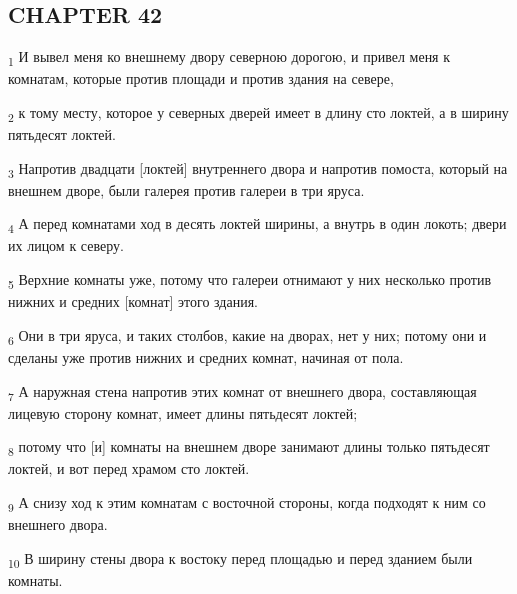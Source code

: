 \subsection{CHAPTER 42}
\begin{tcolorbox}
\textsubscript{1} И вывел меня ко внешнему двору северною дорогою, и привел меня к комнатам, которые против площади и против здания на севере,
\end{tcolorbox}
\begin{tcolorbox}
\textsubscript{2} к тому месту, которое у северных дверей имеет в длину сто локтей, а в ширину пятьдесят локтей.
\end{tcolorbox}
\begin{tcolorbox}
\textsubscript{3} Напротив двадцати [локтей] внутреннего двора и напротив помоста, который на внешнем дворе, были галерея против галереи в три яруса.
\end{tcolorbox}
\begin{tcolorbox}
\textsubscript{4} А перед комнатами ход в десять локтей ширины, а внутрь в один локоть; двери их лицом к северу.
\end{tcolorbox}
\begin{tcolorbox}
\textsubscript{5} Верхние комнаты уже, потому что галереи отнимают у них несколько против нижних и средних [комнат] этого здания.
\end{tcolorbox}
\begin{tcolorbox}
\textsubscript{6} Они в три яруса, и таких столбов, какие на дворах, нет у них; потому они и сделаны уже против нижних и средних комнат, начиная от пола.
\end{tcolorbox}
\begin{tcolorbox}
\textsubscript{7} А наружная стена напротив этих комнат от внешнего двора, составляющая лицевую сторону комнат, имеет длины пятьдесят локтей;
\end{tcolorbox}
\begin{tcolorbox}
\textsubscript{8} потому что [и] комнаты на внешнем дворе занимают длины только пятьдесят локтей, и вот перед храмом сто локтей.
\end{tcolorbox}
\begin{tcolorbox}
\textsubscript{9} А снизу ход к этим комнатам с восточной стороны, когда подходят к ним со внешнего двора.
\end{tcolorbox}
\begin{tcolorbox}
\textsubscript{10} В ширину стены двора к востоку перед площадью и перед зданием были комнаты.
\end{tcolorbox}
